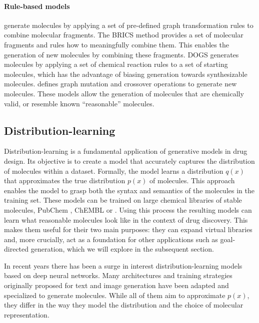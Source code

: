 \paragraph{Rule-based models} generate molecules by applying a set of pre-defined graph transformation rules to
combine molecular fragments. The BRICS \citep{degenArtCompilingUsing2008} method provides a set of
molecular fragments and rules how to meaningfully combine them. This enables the generation of new
molecules by combining these fragments. DOGS \citep{hartenfellerDOGSReactionDrivenNovo2012}
generates molecules by applying a set of chemical reaction rules to a set of starting molecules,
which has the advantage of biasing generation towards synthesizable molecules.\@
\citet{jensenGraphbasedGeneticAlgorithm2019} defines graph mutation and crossover operations to
generate new molecules. These models allow the generation of molecules that are chemically valid, or
resemble known ``reasonable'' molecules.


\subsection{Distribution-learning}
Distribution-learning is a fundamental application of generative models in drug design. Its
objective is to create a model that accurately captures the distribution of molecules within a
dataset. Formally, the model learns a distribution $q(x)$ that approximates the true distribution
$p(x)$ of molecules. This approach enables the model to grasp both the syntax and semantics of the
molecules in the training set. These models can be trained on large chemical libraries of stable
molecules, PubChem \citep{pubchem}, ChEMBL \citep{bentoChEMBLBioactivityDatabase2014} or
\citep{zinc}. Using this process the resulting models can learn what reasonable molecules look like
in the context of drug discovery. This makes them useful for their two main purposes: they can
expand virtual libraries and, more crucially, act as a foundation for other applications such as
goal-directed generation, which we will explore in the subsequent section.

In recent years there has been a surge in interest distribution-learning models based on deep neural
networks. Many architectures and training strategies originally proposed for text and image
generation have been adapted and specialized to generate molecules. While all of them aim to
approximate $p(x)$, they differ in the way they model the distribution and the choice of molecular
representation.


